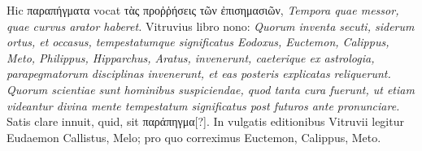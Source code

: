 Hic \textgreek{παραπήγματα} vocat \textgreek{τὰς
προῤῥήσεις τῶν ἐπισημασιῶν}, \textit{Tempora quae
messor, quae curvus arator haberet.}
Vitruvius libro nono: \textit{Quorum inventa
secuti, siderum ortus, et occasus, tempestatumque
significatus Eodoxus,
Euctemon, Calippus, Meto, Philippus,
Hipparchus, Aratus, invenerunt,
caeterique ex astrologia, parapegmatorum
disciplinas invenerunt, et
eas posteris explicatas reliquerunt.}
\textit{Quorum
scientiae sunt hominibus suspiciendae,
quod tanta cura fuerunt, ut etiam videantur divina mente tempestatum
significatus post futuros ante pronunciare.}
%
Satis clare innuit,
quid, sit \textgreek{παράπηγμα[?]}.
In vulgatis editionibus Vitruvii legitur Eudaemon
Callistus, Melo; pro quo correximus Euctemon, Calippus,
Meto.
%
